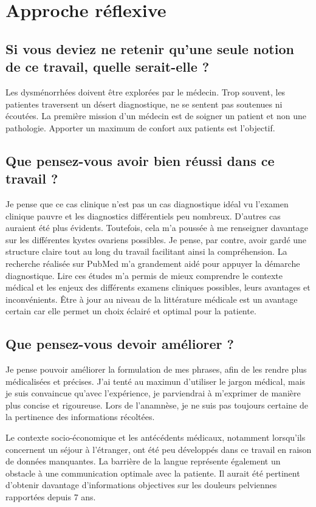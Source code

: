 \section{Approche réflexive}

\subsection{Si vous deviez ne retenir qu’une seule notion de ce travail, quelle serait-elle ?}
Les dysménorrhées doivent être explorées par le médecin. Trop souvent, les patientes traversent un désert diagnostique, ne se sentent pas soutenues ni écoutées. La première mission d’un médecin est de soigner un patient et non une pathologie. Apporter un maximum de confort aux patients est l'objectif.

\subsection{Que pensez-vous avoir bien réussi dans ce travail ?}
Je pense que ce cas clinique n’est pas un cas diagnostique idéal vu l’examen clinique pauvre et les diagnostics différentiels peu nombreux. D’autres cas auraient été plus évidents. Toutefois, cela m’a poussée à me renseigner davantage sur les différentes kystes ovariens possibles. Je pense, par contre, avoir gardé une structure claire tout au long du travail facilitant ainsi la compréhension. La recherche réalisée sur PubMed m’a grandement aidé pour appuyer la démarche diagnostique. Lire ces études m'a permis de mieux comprendre le contexte médical et les enjeux des différents examens cliniques possibles, leurs avantages et inconvénients. Être à jour au niveau de la littérature médicale est un avantage certain car elle permet un choix éclairé et optimal pour la patiente.

\subsection{Que pensez-vous devoir améliorer ?}
Je pense pouvoir améliorer la formulation de mes phrases, afin de les rendre plus médicalisées et précises. J’ai tenté au maximun d'utiliser le jargon médical, mais je suis convaincue qu’avec l’expérience, je parviendrai à m’exprimer de manière plus concise et rigoureuse. Lors de l’anamnèse, je ne suis pas toujours certaine de la pertinence des informations récoltées.

Le contexte socio-économique et les antécédents médicaux, notamment lorsqu’ils concernent un séjour à l’étranger, ont été peu développés dans ce travail en raison de données manquantes. La barrière de la langue représente également un obstacle à une communication optimale avec la patiente. Il aurait été pertinent d’obtenir davantage d’informations objectives sur les douleurs pelviennes rapportées depuis 7 ans.

